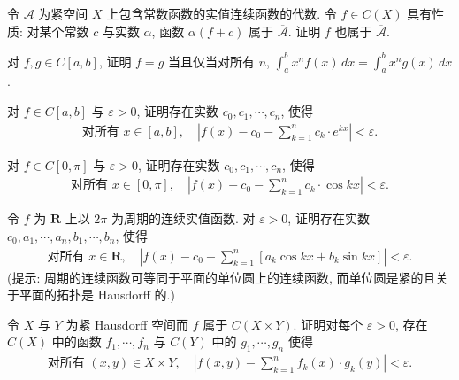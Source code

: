 \documentclass[../../main.tex]{subfiles}
\begin{document}
\begin{exercise}\label{exercise:ch12-26}
令 $\mathcal{A}$ 为紧空间 $X$ 上包含常数函数的实值连续函数的代数. 令 $f\in C(X)$ 具有性质: 对某个常数 $c$ 与实数 $\alpha$, 函数 $\alpha(f+c)$ 属于 $\overline{\mathcal{A}}$. 证明 $f$ 也属于 $\overline{\mathcal{A}}$.
\end{exercise}

\begin{exercise}\label{exercise:ch12-27}
对 $f,g\in C[a,b]$, 证明 $f=g$ 当且仅当对所有 $n$, $\int_{a}^{b}x^{n}f(x)\,dx=\int_{a}^{b}x^{n}g(x)\,dx$.
\end{exercise}

\begin{exercise}\label{exercise:ch12-28}
对 $f\in C[a,b]$ 与 $\varepsilon>0$, 证明存在实数 $c_{0},c_{1},\cdots,c_{n}$, 使得
\begin{align*}
\text{对所有 }x\in[a,b],\quad\left|f(x)-c_{0}-\sum_{k=1}^{n}c_{k}\cdot e^{kx}\right|<\varepsilon.
\end{align*}
\end{exercise}

\begin{exercise}\label{exercise:ch12-29}
对 $f\in C[0,\pi]$ 与 $\varepsilon>0$, 证明存在实数 $c_{0},c_{1},\cdots,c_{n}$, 使得
\begin{align*}
\text{对所有 }x\in[0,\pi],\quad\left|f(x)-c_{0}-\sum_{k=1}^{n}c_{k}\cdot\cos kx\right|<\varepsilon.
\end{align*}
\end{exercise}

\begin{exercise}\label{exercise:ch12-30}
令 $f$ 为 $\mathbf{R}$ 上以 $2\pi$ 为周期的连续实值函数. 对 $\varepsilon>0$, 证明存在实数 $c_{0},a_{1},\cdots,a_{n},b_{1},\cdots,b_{n}$, 使得
\begin{align*}
\text{对所有 }x\in\mathbf{R},\quad\left|f(x)-c_{0}-\sum_{k=1}^{n}[a_{k}\cos kx+b_{k}\sin kx]\right|<\varepsilon.
\end{align*}
(提示: 周期的连续函数可等同于平面的单位圆上的连续函数, 而单位圆是紧的且关于平面的拓扑是 Hausdorff 的.)
\end{exercise}

\begin{exercise}\label{exercise:ch12-31}
令 $X$ 与 $Y$ 为紧 Hausdorff 空间而 $f$ 属于 $C(X\times Y)$. 证明对每个 $\varepsilon>0$, 存在 $C(X)$ 中的函数 $f_{1},\cdots,f_{n}$ 与 $C(Y)$ 中的 $g_{1},\cdots,g_{n}$ 使得
\begin{align*}
\text{对所有 }(x,y)\in X\times Y,\quad\left|f(x,y)-\sum_{k=1}^{n}f_{k}(x)\cdot g_{k}(y)\right|<\varepsilon.
\end{align*}
\end{exercise}
\end{document}

